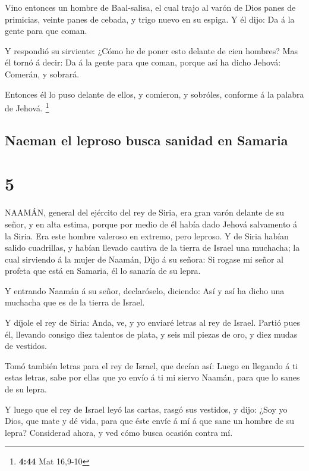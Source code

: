  Vino entonces un hombre de Baal-salisa, el cual trajo al
varón de Dios panes de primicias, veinte panes de cebada, y trigo nuevo
en su espiga. Y él dijo: Da á la gente para que coman.

 Y respondió su sirviente: ¿Cómo he de poner esto delante
de cien hombres? Mas él tornó á decir: Da á la gente para que coman,
porque así ha dicho Jehová: Comerán, y sobrará.

 Entonces él lo puso delante de ellos, y comieron, y
sobróles, conforme á la palabra de Jehová. \footnote{\textbf{4:44} Mat
  16,9-10}

\hypertarget{naeman-el-leproso-busca-sanidad-en-samaria}{%
\subsection{Naeman el leproso busca sanidad en
Samaria}\label{naeman-el-leproso-busca-sanidad-en-samaria}}

\hypertarget{section-4}{%
\section{5}\label{section-4}}

 NAAMÁN, general del ejército del rey de Siria, era gran
varón delante de su señor, y en alta estima, porque por medio de él
había dado Jehová salvamento á la Siria. Era este hombre valeroso en
extremo, pero leproso.  Y de Siria habían salido cuadrillas,
y habían llevado cautiva de la tierra de Israel una muchacha; la cual
sirviendo á la mujer de Naamán,  Dijo á su señora: Si rogase
mi señor al profeta que está en Samaria, él lo sanaría de su lepra.

 Y entrando Naamán á su señor, declaróselo, diciendo: Así y
así ha dicho una muchacha que es de la tierra de Israel.

 Y díjole el rey de Siria: Anda, ve, y yo enviaré letras al
rey de Israel. Partió pues él, llevando consigo diez talentos de plata,
y seis mil piezas de oro, y diez mudas de vestidos.

 Tomó también letras para el rey de Israel, que decían así:
Luego en llegando á ti estas letras, sabe por ellas que yo envío á ti mi
siervo Naamán, para que lo sanes de su lepra.

 Y luego que el rey de Israel leyó las cartas, rasgó sus
vestidos, y dijo: ¿Soy yo Dios, que mate y dé vida, para que éste envíe
á mí á que sane un hombre de su lepra? Considerad ahora, y ved cómo
busca ocasión contra mí.

